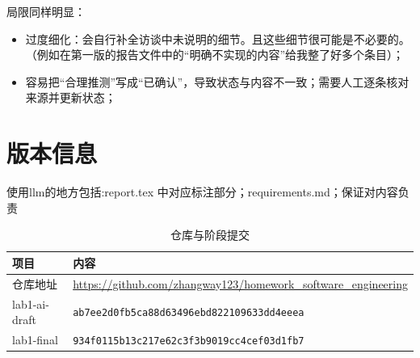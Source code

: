 \documentclass[UTF8,a4paper,zihao=-4]{ctexart}
\begin{document}
局限同样明显：

\begin{itemize}
  \item 过度细化：会自行补全访谈中未说明的细节。且这些细节很可能是不必要的。（例如在第一版的报告文件中的“明确不实现的内容”给我整了好多个条目）；
  \item 容易把“合理推测”写成“已确认”，导致状态与内容不一致；需要人工逐条核对来源并更新状态；
\end{itemize}

\section{版本信息}
使用llm的地方包括:report.tex 中对应标注部分；requirements.md；保证对内容负责
\begin{table}[H]
\centering
\caption{仓库与阶段提交}
\begin{tabular}{p{3.4cm}p{11.2cm}}
\toprule
项目 & 内容 \\
\midrule
仓库地址 & \url{https://github.com/zhangway123/homework_software_engineering} \\
lab1-ai-draft & \texttt{ab7ee2d0fb5ca88d63496ebd822109633dd4eeea} \\
lab1-final & \texttt{934f0115b13c217e62c3f3b9019cc4cef03d1fb7} \\
\bottomrule
\end{tabular}
\end{table}
\end{document}
